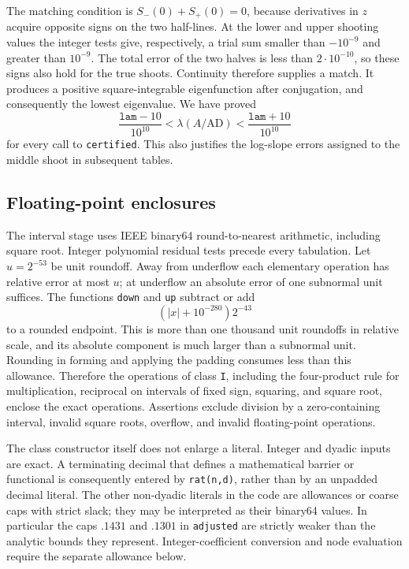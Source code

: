 \documentclass[11pt,a4paper]{article}
\numberwithin{equation}{section}
\theoremstyle{definition}
\theoremstyle{remark}
\begin{document}
The matching condition is $S_-(0)+S_+(0)=0$, because derivatives in $z$
acquire opposite signs on the two half-lines.  At the lower and upper
shooting values the integer tests give, respectively, a trial sum smaller
than $-10^{-9}$ and greater than $10^{-9}$.  The total error of the two
halves is less than $2\cdot10^{-10}$, so these signs also hold for the true
shoots.  Continuity therefore supplies a match.  It produces a positive
square-integrable eigenfunction after conjugation, and consequently the
lowest eigenvalue.  We have proved
\begin{equation}\label{cert:lambda-window}
 \frac{\texttt{lam}-10}{10^{10}}
 <\lambda(A/\mathrm{AD})<
 \frac{\texttt{lam}+10}{10^{10}}
\end{equation}
for every call to \texttt{certified}.  This also justifies the log-slope
errors assigned to the middle shoot in subsequent tables.

\subsection{Floating-point enclosures}\label{cert:arithmetic}

The interval stage uses IEEE binary64 round-to-nearest arithmetic, including
square root.  Integer polynomial residual tests precede every tabulation.
Let $u=2^{-53}$ be unit roundoff.  Away from underflow each elementary
operation has relative error at most $u$; at underflow an absolute error of
one subnormal unit suffices.  The functions \texttt{down} and \texttt{up}
subtract or add
\[
 (|x|+10^{-280})2^{-43}
\]
to a rounded endpoint.  This is more than one thousand unit roundoffs in
relative scale, and its absolute component is much larger than a subnormal
unit.  Rounding in forming and applying the padding consumes less than this
allowance.  Therefore the operations of class \texttt{I}, including the
four-product rule for multiplication, reciprocal on intervals of fixed sign,
squaring, and square root, enclose the exact operations.  Assertions exclude
division by a zero-containing interval, invalid square roots, overflow, and
invalid floating-point operations.

The class constructor itself does not enlarge a literal.  Integer and dyadic
inputs are exact.  A terminating decimal that defines a mathematical barrier
or functional is consequently entered by \texttt{rat(n,d)}, rather than by
an unpadded decimal literal.  The other non-dyadic literals in the code are
allowances or coarse caps with strict slack; they may be interpreted as their
binary64 values.  In particular the caps $.1431$ and $.1301$ in
\texttt{adjusted} are strictly weaker than the analytic bounds they represent.
Integer-coefficient conversion and node evaluation require the separate
allowance below.
\end{document}
